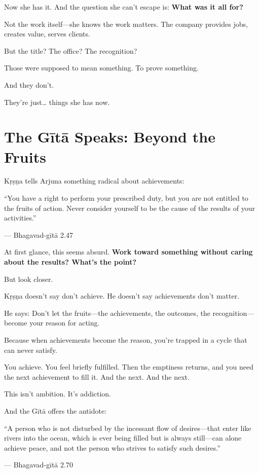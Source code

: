 \documentclass[11pt,twoside]{book}
\begin{document}
Now she has it. And the question she can't escape is: \textbf{What was it all for?}

Not the work itself—she knows the work matters. The company provides jobs, creates value, serves clients.

But the title? The office? The recognition?

Those were supposed to mean something. To prove something.

And they don't.

They're just\ldots{} things she has now.

\section*{The Gītā Speaks: Beyond the Fruits}

Kṛṣṇa tells Arjuna something radical about achievements:

\begin{pullquote}
``You have a right to perform your prescribed duty, but you are not entitled to the fruits of action. Never consider yourself to be the cause of the results of your activities.''

--- Bhagavad-gītā 2.47
\end{pullquote}

At first glance, this seems absurd. \textbf{Work toward something without caring about the results? What's the point?}

But look closer.

Kṛṣṇa doesn't say don't achieve. He doesn't say achievements don't matter.

He says: Don't let the fruits—the achievements, the outcomes, the recognition—become your reason for acting.

Because when achievements become the reason, you're trapped in a cycle that can never satisfy.

You achieve. You feel briefly fulfilled. Then the emptiness returns, and you need the next achievement to fill it. And the next. And the next.

This isn't ambition. It's addiction.

And the Gītā offers the antidote:

\begin{pullquote}
``A person who is not disturbed by the incessant flow of desires—that enter like rivers into the ocean, which is ever being filled but is always still—can alone achieve peace, and not the person who strives to satisfy such desires.''

--- Bhagavad-gītā 2.70
\end{pullquote}
\end{document}
